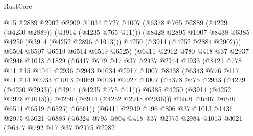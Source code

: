 \begin{lexlean}{RustCore}
\begin{coremodule}
                    @15
                    @2889
                    @2902
                    @2909
                    @1034
                    @727
                    @1007
                    (@6378 @765 @2889 (@4229 (@4230 @2889)) (@3914 (@4235 @765 @11)))
                    (@8428 @2895 @1007 @8438 @6385 @4250 (@3914 (@4252 @2896 @1013)))
                    @4250
                    (@3914 (@4252 @2884 @2902)))
                  @6504
                  @6507
                  @6510
                  @6514
                  @6519
                  @6525)
                (@6411
                  @2912
                  @780
                  @418
                  @37
                  @2937
                  @2946
                  @1013
                  @1829
                  (@6447
                    @779
                    @17
                    @37
                    @2937
                    @2944
                    @1933
                    (@8421
                      @778
                      @11
                      @15
                      @1041
                      @2936
                      @2943
                      @1034
                      @2917
                      @1007
                      @8438
                      (@6343
                        @776
                        @117
                        @11
                        @14
                        @2933
                        @1013
                        @1069
                        @1034
                        @2927
                        @1007
                        (@6378 @775 @2933 (@4229 (@4230 @2933)) (@3914 (@4235 @775 @11)))
                        @6385
                        @4250
                        (@3914 (@4252 @2928 @1013)))
                      @4250
                      (@3914 (@4252 @2918 @2936)))
                    @6504
                    @6507
                    @6510
                    @6514
                    @6519
                    @6525)
                  @6601))
              (@6411
                @2949
                @196
                @806
                @37
                @1013
                @1436
                @2975
                @3021
                @6885
                (@6324
                  @793
                  @804
                  @418
                  @37
                  @2975
                  @2984
                  @1013
                  @3021
                  (@6447
                    @792
                    @17
                    @37
                    @2975
                    @2982

\end{coremodule}
\end{lexlean}
